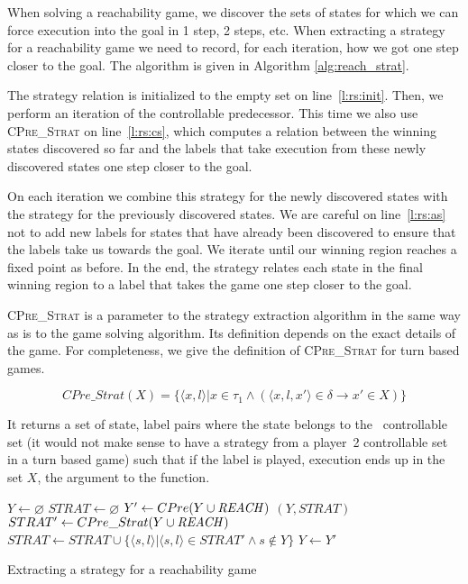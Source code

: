 When solving a reachability game, we discover the sets of states for which we can force execution into the goal in 1 step, 2 steps, etc. When extracting a strategy for a reachability game we need to record, for each iteration, how we got one step closer to the goal. The algorithm is given in Algorithm \ref{alg:reach_strat}. 

The strategy relation is initialized to the empty set on line~\ref{l:rs:init}. Then, we perform an iteration of the controllable predecessor. This time we also use \textsc{CPre\_Strat} on line~\ref{l:rs:cs}, which computes a relation between the winning states discovered so far and the labels that take execution from these newly discovered states one step closer to the goal.

On each iteration we combine this strategy for the newly discovered states with the strategy for the previously discovered states. We are careful on line~\ref{l:rs:as} not to add new labels for states that have already been discovered to ensure that the labels take us towards the goal. We iterate until our winning region reaches a fixed point as before. In the end, the strategy relates each state in the final winning region to a label that takes the game one step closer to the goal.

\textsc{CPre\_Strat} is a parameter to the strategy extraction algorithm in the same way as \textsc{\cpre} is to the game solving algorithm. Its definition depends on the exact details of the game. For completeness, we give the definition of \textsc{CPre\_Strat} for turn based games. 

\begin{equation}
    CPre\_Strat(X) = \{\langle x, l \rangle | x \in \tau_1 \wedge (\langle x, l, x' \rangle \in \delta \rightarrow x' \in X)\}
\end{equation}

It returns a set of state, label pairs where the state belongs to the \pone\ controllable set (it would not make sense to have a strategy from a player~2 controllable set in a turn based game) such that if the label is played, execution ends up in the set $X$, the argument to the function.

\begin{algorithm}[t]
    \begin{algorithmic}[1]

\State $Y \gets \varnothing$ \label{l:rs:init}
\State $STRAT \gets \varnothing$
    \Loop
        \State $Y' \gets CPre(Y \cup \mathit{REACH})$
            \State\Return $(Y, STRAT)$
        \EndIf
        \State $STRAT' \gets CPre\_Strat(Y \cup \mathit{REACH})$ \label{l:rs:cs}
        \State $STRAT \gets STRAT \cup \{\langle s, l \rangle | \langle s, l \rangle \in STRAT' \wedge s \notin Y\}$  \label{l:rs:as}
        \State $Y \gets Y'$
    \EndLoop
\EndFunction

\end{algorithmic}
\caption{Extracting a strategy for a reachability game}
\label{alg:reach_strat}
\end{algorithm}

